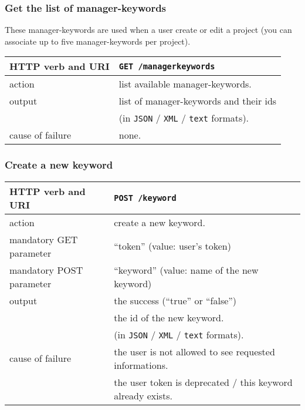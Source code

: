 \subsubsection{Get the list of manager-keywords}
\hspace*{\parindent}
These manager-keywords are used when a user create or edit a project
(you can associate up to five manager-keywords per project).
\newline
\begin{tabular}{ | l | l | }
	\hline
	HTTP verb and URI & \texttt{GET /managerkeywords} \\
	\hline
	action & list available manager-keywords. \\
	\hline
	output & list of manager-keywords and their ids \\
	\space & (in \texttt{JSON} / \texttt{XML} / \texttt{text} formats). \\
	\hline
	cause of failure & none. \\
	\hline
\end{tabular}
\newline

\subsubsection{Create a new keyword}
\begin{tabular}{ | l | l | }
	\hline
	HTTP verb and URI & \texttt{POST /keyword} \\
	\hline
	action & create a new keyword. \\
	\hline
	mandatory GET parameter & ``token'' (value: user's token) \\
	\hline
	mandatory POST parameter & ``keyword'' (value: name of the new keyword) \\
	\hline
	output & the success (``true'' or ``false'')  \\
	\space & the id of the new keyword.  \\
	\space & (in \texttt{JSON} / \texttt{XML} / \texttt{text} formats). \\
	\hline
	cause of failure & the user is not allowed to see requested informations. \\
	\space & the user token is deprecated / this keyword already exists. \\
	\hline
\end{tabular}
\newline

